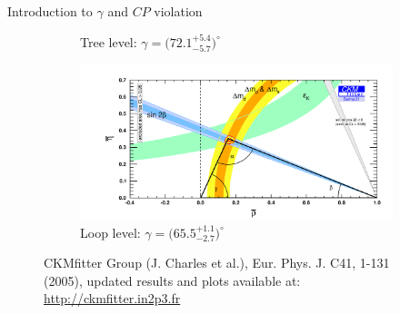 \documentclass[xcolor={dvipsnames}]{beamer}
\begin{document}
\begin{frame}{Introduction to $\gamma$ and $C\!P$ violation}
\begin{figure}
\begin{subfigure}{0.5\textwidth}
      \caption{Tree level: $\gamma = \big(72.1^{+5.4}_{-5.7}\big)^\circ$}
    \end{subfigure}%
    \begin{subfigure}{0.5\textwidth}
      \centering
      \includegraphics[width = 1.0\textwidth]{Plots/ckmfitter_loop.png}
      \caption{Loop level: $\gamma = \big(65.5^{+1.1}_{-2.7}\big)^\circ$}
    \end{subfigure}
    \vspace{-0.3cm}
    \captionsetup{justification=centering}
    \caption*{\centering\tiny CKMfitter Group (J. Charles et al.), Eur. Phys. J. C41, 1-131 (2005), updated results and plots available at: \href{http://ckmfitter.in2p3.fr}{http://ckmfitter.in2p3.fr}}
  \end{figure}
\end{frame}
\end{document}
